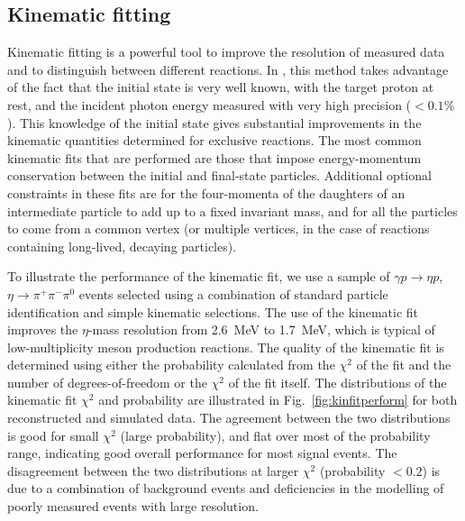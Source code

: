 \subsection{Kinematic fitting \label{sec:perffitting}}

Kinematic fitting is a powerful tool to improve the resolution of measured data and to distinguish between different reactions.  In \gx{}, this method takes advantage of the fact that the initial state is very well known, with the target proton at rest, and the incident photon energy measured with very high precision ($<0.1\%$). This knowledge of the initial state gives substantial improvements in the kinematic quantities determined for exclusive reactions.  The most common kinematic fits that are performed are those that impose energy-momentum conservation between the initial and final-state particles.  Additional optional constraints in these fits are for the four-momenta of the daughters of an intermediate particle to add up to a fixed invariant mass, and for all the particles to come from a common vertex (or multiple vertices, in the case of reactions containing long-lived, decaying particles).

To illustrate the performance of the kinematic fit, we use a sample of $\gamma p \to \eta p$, $\eta \to \pi^+\pi^-\pi^0$ events selected using a combination of standard particle identification and simple kinematic selections.  
The use of the kinematic fit improves the $\eta$-mass resolution  from  2.6~MeV to 1.7~MeV, which is typical of low-multiplicity meson production reactions.  
The quality of the kinematic fit is determined using either the probability calculated from the $\chi^2$ of the fit and the number of degrees-of-freedom or the $\chi^2$ of the fit itself. 
The distributions of the kinematic fit $\chi^2$ and probability are illustrated in Fig.~\ref{fig:kinfitperform} for both reconstructed and simulated data.  The agreement between the two distributions is good for small $\chi^2$ (large probability), and flat over most of the probability range, indicating good overall performance for most signal events.  The disagreement between the two distributions at larger $\chi^2$ (probability $<0.2$) is due to a combination of background events and deficiencies in the modelling of poorly measured events with large resolution.


